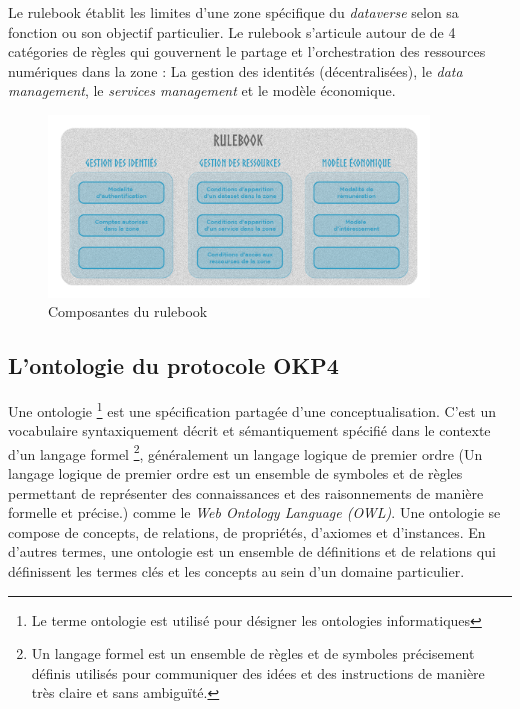 Le rulebook établit les limites d'une zone spécifique du \textit{dataverse} selon sa fonction ou son objectif particulier. Le rulebook s'articule autour de de 4 catégories de règles qui gouvernent le partage et l'orchestration des ressources numériques dans la zone : La gestion des identités (décentralisées), le \textit{data management}, le \textit{services management} et le modèle économique.


\begin{figure}[h]
    \centering
    \includegraphics[width=0.9\textwidth]{ILLUSTRATIONS/composantes_rulebook.png}
    \caption{Composantes du rulebook}
    \label{fig:gouvernance_rulebook}
\end{figure}

\subsection{L'ontologie du protocole OKP4} \label{subsec:ontolologie}


Une ontologie \footnote{Le terme ontologie est utilisé pour désigner les ontologies informatiques} est une spécification partagée d’une conceptualisation. C’est un vocabulaire syntaxiquement décrit et sémantiquement spécifié dans le contexte d’un langage formel \footnote{Un langage formel est un ensemble de règles et de symboles précisement définis utilisés pour communiquer des idées et des instructions de manière très claire et sans ambiguïté.}, généralement un langage logique de premier ordre (Un langage logique de premier ordre est un ensemble de symboles et de règles permettant de représenter des connaissances et des raisonnements de manière formelle et précise.) comme le \textit{Web Ontology Language (OWL)}. Une ontologie se compose de concepts, de relations, de propriétés, d'axiomes et d'instances. En d'autres termes, une ontologie est un ensemble de définitions et de relations qui définissent les termes clés et les concepts au sein d'un domaine particulier.


